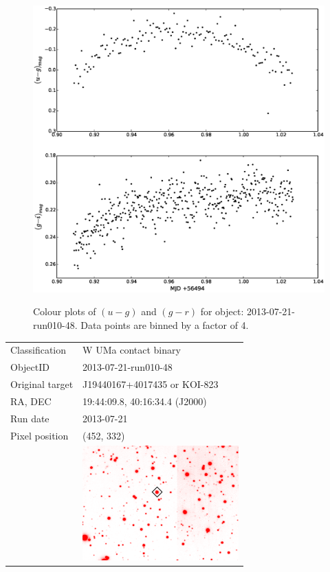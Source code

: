 \begin{figure}
  \center
  \includegraphics[width=120mm]{images/2013-07-21-run010-48_colourcurve-bin4.eps}
  \label{fig:2013-07-21-run010-48-colour}
  \caption{Colour plots of $(u-g)$ and $(g-r)$ for object: 2013-07-21-run010-48. Data points are binned by a factor of 4.}
\end{figure}


  \begin{tabular}{l l}
  Classification & {W UMa} contact binary \\
  ObjectID & 2013-07-21-run010-48 \\
  Original target & J19440167+4017435 or KOI-823 \\
  RA, DEC & 19:44:09.8, 40:16:34.4 (J2000) \\
  Run date & 2013-07-21 \\
  Pixel position & (452, 332) \\
       & \includegraphics[width=60mm]{images/2013-07-21-run010-48.png} \\
  \end{tabular}
 
